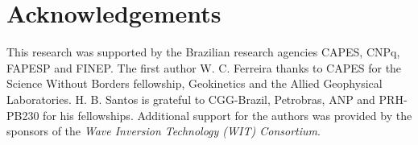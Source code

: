 \documentclass{vie16}
\begin{document}
\section{Acknowledgements}
This research was supported by the Brazilian research agencies CAPES, CNPq, 
FAPESP and FINEP. The first author W. C. Ferreira thanks to CAPES for the 
Science Without Borders fellowship, Geokinetics and the Allied Geophysical 
Laboratories. H. B. Santos is grateful to CGG-Brazil, Petrobras, ANP and 
PRH-PB230 for his fellowships. Additional support for the authors was 
provided by the sponsors of the \textit{Wave Inversion Technology (WIT) 
Consortium}.


\end{document}
